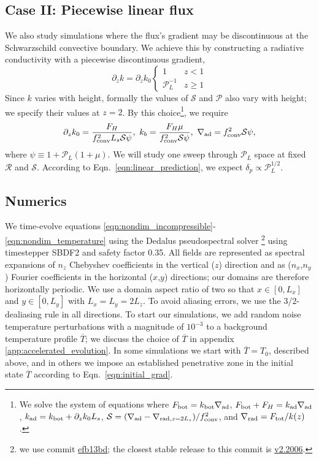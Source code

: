 \documentclass[twocolumn]{aastex631}
\newcommand{\gradrad}{\ensuremath{\nabla_{\rm{rad}}}}
\newcommand{\gradad}{\ensuremath{\nabla_{\rm{ad}}}}
\newcommand{\justgrad}{\ensuremath{\nabla}}
\newcommand{\mP}{\ensuremath{\mathcal{P}}}
\newcommand{\mR}{\ensuremath{\mathcal{R}}}
\newcommand{\mS}{\ensuremath{\mathcal{S}}}
\renewcommand{\bar}[1]{\overline{#1}}
\begin{document}
\subsection{Case II: Piecewise linear flux}
We also study simulations where the flux's gradient may be discontinuous at the Schwarzschild convective boundary.
We achieve this by constructing a radiative conductivity with a piecewise discontinuous gradient,
\begin{equation}
\partial_z k = \partial_z k_0
\begin{cases}
1	&	z < 1 \\
\mP_L^{-1} &	z \geq 1
\end{cases}
\label{eqn:sim_linear_k}
\end{equation}
Since $k$ varies with height, formally the values of $\mS$ and $\mP$ also vary with height; we specify their values at $z = 2$.
By this choice\footnote{
We solve the system of equations where ${F_{\rm{bot}} = k_{\rm{bot}}\gradad}$, ${F_{\rm{bot}} + F_H = k_{\rm{ad}}\gradad}$, ${k_{\rm{ad}} = k_{\rm{bot}} + \partial_z k_0 L_s}$, ${\mS = (\gradad - \justgrad_{\mathrm{rad},z=2L_s})/f_{\rm{conv}}^2}$, and ${\gradrad = F_{\rm{tot}}/k(z)}$.
}, we require
\begin{equation}
\partial_z k_0 = \frac{F_{H}}{f_{\rm{conv}}^2L_s \mS \psi},\,\,
k_b = \frac{F_H \mu}{f_{\rm{conv}}^2\mS\psi},\,\,
\gradad = f_{\rm{conv}}^2 \mS \psi,
\end{equation}
where $\psi \equiv 1 + \mP_L(1 + \mu)$.
We will study one sweep through $\mP_L$ space at fixed $\mR$ and $\mS$.
According to Eqn.~\ref{eqn:linear_prediction}, we expect $\delta_p \propto \mP_L^{1/2}$.

\subsection{Numerics}
\label{sct:numerics}
We time-evolve equations \ref{eqn:nondim_incompressible}-\ref{eqn:nondim_temperature} using the Dedalus pseudospectral solver \citep{burns_etal_2020}\footnote{we use commit \href{https://github.com/DedalusProject/dedalus/commit/efb13bdaa09816dde3eee897bc2a15fc284ea2f1}{efb13bd}; the closest stable release to this commit is \href{https://github.com/DedalusProject/dedalus/releases/tag/v2.2006}{v2.2006}.} using timestepper SBDF2 \citep{wang&ruuth2008} and safety factor 0.35.
All fields are represented as spectral expansions of $n_z$ Chebyshev coefficients in the vertical ($z$) direction and as ($n_x$,$n_y$) Fourier coefficients in the horizontal ($x$,$y$) directions; our domains are therefore horizontally periodic.
We use a domain aspect ratio of two so that $x \in [0, L_x]$ and $y \in [0, L_y]$ with $L_x = L_y = 2 L_z$.
To avoid aliasing errors, we use the 3/2-dealiasing rule in all directions.
To start our simulations, we add random noise temperature perturbations with a magnitude of $10^{-3}$ to a background temperature profile $\overline{T}$; we discuss the choice of $\overline{T}$ in appendix \ref{app:accelerated_evolution}.
In some simulations we start with $\bar{T} = T_0$, described above, and in others we impose an established penetrative zone in the initial state $\bar{T}$ according to Eqn.~\ref{eqn:initial_grad}.
\end{document}
